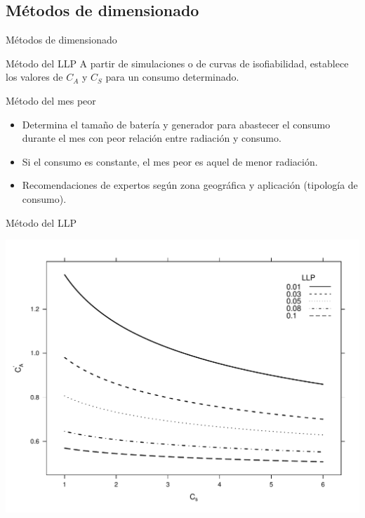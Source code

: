 \documentclass[xcolor={usenames,svgnames,dvipsnames}]{beamer}
\begin{document}
\subsection{Métodos de dimensionado}
\label{sec:org0a2b559}
\begin{frame}[label={sec:orge5d688b}]{Métodos de dimensionado}
\begin{block}{Método del LLP}
A partir de simulaciones o de curvas de isofiabilidad, establece los
valores de \(C_{A}\) y \(C_{S}\) para un consumo determinado.
\end{block}

\begin{block}{Método del mes peor}
\begin{itemize}
\item Determina el tamaño de batería y generador para abastecer el consumo durante el mes con peor relación entre radiación y consumo.
\item Si el consumo es constante, el mes peor es aquel de menor radiación.
\item Recomendaciones de expertos según zona geográfica y aplicación (tipología de consumo).
\end{itemize}
\end{block}
\end{frame}

\begin{frame}[label={sec:org147d2b0}]{Método del LLP}
\begin{center}
\includegraphics[width=.9\linewidth]{../figs/CurvasLLP.pdf}
\end{center}
\end{frame}
\end{document}
